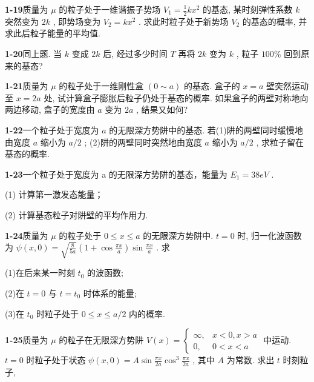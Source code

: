 \vfill

\newpage
\vfill

\noindent
\textbf{1-19}\quad 质量为 $\mu$ 的粒子处于一维谐振子势场 $V_{1} = \frac{1}{2} kx^{2}$ 的基态, 某时刻弹性系数 $k$ 突然变为 $2k$ , 即势场变为 $V_{2} = kx^{2}$ . 求此时粒子处于新势场 $V_{2}$ 的基态的概率, 并求此后粒子能量的平均值.

\vfill

\newpage
\vfill

\noindent
\textbf{1-20}\quad 同上题. 当 $k$ 变成 $2k$ 后, 经过多少时间 $T$ 再将 $2k$ 变为 $k$ , 粒子 $100\%$ 回到原来的基态?

\vfill

\newpage
\vfill

\noindent
\textbf{1-21}\quad 质量为 $\mu$ 的粒子处于一维刚性盒 $(0 \sim a)$ 的基态. 盒子的 $x = a$ 壁突然运动至 $x = 2a$ 处, 试计算盒子膨胀后粒子仍处于基态的概率. 如果盒子的两壁对称地向两边移动, 盒子的宽度由 $a$ 变为 $2a$ , 结果又如何?

\vfill

\newpage
\vfill

\noindent
\textbf{1-22}\quad 一个粒子处于宽度为 $a$ 的无限深方势阱中的基态. 若(1)阱的两壁同时缓慢地由宽度 $a$ 缩小为 $a / 2$ ; (2)阱的两壁同时突然地由宽度 $a$ 缩小为 $a / 2$ , 求粒子留在基态的概率.

\vfill

\newpage
\vfill

\noindent
\textbf{1-23}\quad 一个粒子处于宽度为 a 的无限深方势阱的基态，能量为 $E_{1}=38eV$ . 

(1) 计算第一激发态能量；

(2) 计算基态粒子对阱壁的平均作用力.

\vfill

\newpage
\vfill

\noindent
\textbf{1-24}\quad 质量为 $\mu$ 的粒子处于 $0 \leqslant x \leqslant a$ 的无限深方势阱中. $t = 0$ 时, 归一化波函数为 $\psi(x,0) = \sqrt{\frac{8}{5a}}\left(1 + \cos \frac{\pi x}{a}\right)\sin \frac{\pi x}{a}$ . 求

(1)在后来某一时刻 $t_0$ 的波函数; 

(2)在 $t = 0$ 与 $t = t_0$ 时体系的能量; 

(3)在 $t_0$ 时粒子处于 $0 \leqslant x \leqslant a / 2$ 内的概率.

\vfill

\newpage
\vfill

\noindent
\textbf{1-25}\quad 质量为 $\mu$ 的粒子在无限深方势阱 $V(x) = \begin{cases} \infty, & x < 0, x > a \\ 0, & 0 < x < a \end{cases}$ 中运动. $t = 0$ 时粒子处于状态 $\psi(x,0) = A\sin \frac{\pi x}{2a}\cos^3\frac{\pi x}{2a}$ , 其中 $A$ 为常数. 求出 $t$ 时刻粒子, 

